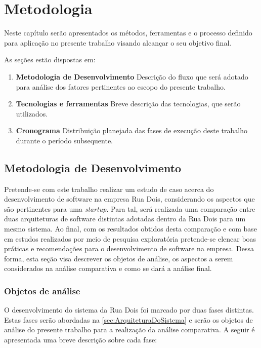 \chapter{Metodologia}

Neste capítulo serão apresentados os métodos, ferramentas e o processo definido
para aplicação no presente trabalho visando alcançar o seu objetivo final.

  As seções estão dispostas em:

  \begin{enumerate}
    \item \textbf{Metodologia de Desenvolvimento} Descrição do fluxo que será
    adotado para análise dos fatores pertinentes ao escopo do presente trabalho.
    \item \textbf{Tecnologias e ferramentas} Breve descrição das tecnologias,
    que serão utilizados.
    \item \textbf{Cronograma} Distribuição planejada das fases de execução deste
    trabalho durante o período subsequente.
  \end{enumerate}

\section{Metodologia de Desenvolvimento}

Pretende-se com este trabalho realizar um estudo de caso acerca do desenvolvimento
de software na empresa Rua Dois, considerando os aspectos que são pertinentes para
uma \textit{startup}. Para tal, será realizada uma comparação entre duas arquiteturas
de software distintas adotadas dentro da Rua Dois para um mesmo sistema. Ao final,
com os resultados obtidos desta comparação e com base em estudos realizados por meio
de pesquisa exploratória pretende-se elencar boas práticas e recomendações para o
desenvolvimento de software na empresa. Dessa forma, esta seção visa descrever
os objetos de análise, os aspectos a serem considerados na análise comparativa e
como se dará a análise final.

\subsection{Objetos de análise}

O desenvolvimento do sistema da Rua Dois foi marcado por duas fases distintas.
Estas fases serão abordadas na \autoref{sec:ArquiteturaDoSistema} e serão
os objetos de análise do presente trabalho para a realização da análise
comparativa. A seguir é apresentada uma breve descrição sobre cada fase:

